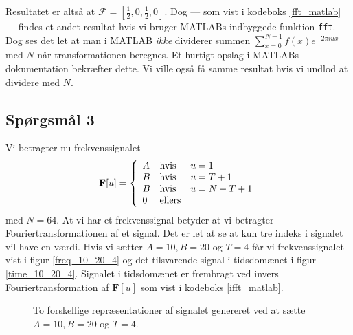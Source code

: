 \documentclass[a4paper, 10pt, danish, final]{article}
\begin{document}
Resultatet er altså at $\mathcal{F} = [\frac{1}{2}, 0, \frac{1}{2}, 0]$.
Dog --- som vist i kodeboks \ref{fft_matlab} --- findes et andet
resultat hvis vi bruger MATLABs indbyggede funktion \texttt{fft}. Dog
ses det let at man i MATLAB \emph{ikke} dividerer summen
$\sum_{x=0}^{N - 1}f(x)e^{-2\pi iux}$ med $N$ når
transformationen beregnes. Et hurtigt opslag i MATLABs dokumentation
bekræfter dette. Vi ville også få samme resultat hvis vi undlod at
dividere med $N$.

\subsection*{Spørgsmål 3}

Vi betragter nu frekvenssignalet
\begin{equation}
    \mathbf{F}[u] = \left\{ \begin{array}{l l l}
        A & \mbox{hvis} & u = 1\\
        B & \mbox{hvis} & u = T + 1\\
        B & \mbox{hvis} & u = N - T + 1\\
        0 & \mbox{ellers} &
    \end{array}\right.
\end{equation}
med $N = 64$. At vi har et frekvenssignal betyder at vi betragter
Fouriertransformationen af et signal. Det er let at se at kun tre indeks
i signalet vil have en værdi. Hvis vi sætter $A = 10, B = 20$ og
$T = 4$ får vi frekvenssignalet vist i figur \ref{freq_10_20_4} og det
tilsvarende signal i tidsdomænet i figur \ref{time_10_20_4}. Signalet i
tidsdomænet er frembragt ved invers Fouriertransformation af
$\mathbf{F}[u]$ som vist i kodeboks \ref{ifft_matlab}.

\begin{figure}[!h]
    \centering
    \caption[]{To forskellige repræsentationer af signalet genereret ved
    at sætte $A = 10, B = 20$ og $T = 4$.}
    \label{signal_10_20_4}
\end{figure}
\end{document}
